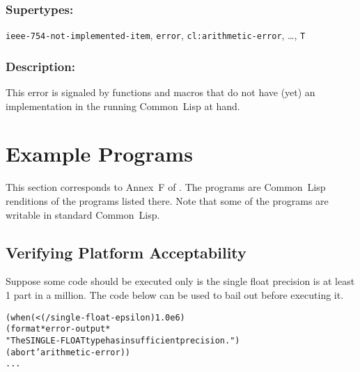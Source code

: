 \documentclass[10pt,fleqn]{article}
\newcommand{\CL}{\textsf{Common~Lisp}}
\newcommand{\code}[1]{\texttt{#1}}
\newcommand{\DSupertypes}{\subsubsection*{Supertypes:}}
\newcommand{\DDescription}{\subsubsection*{Description:}}
\begin{document}
\DSupertypes{}

\code{ieee-754-not-implemented-item}, \code{error},
\code{cl:arithmetic-error}, \ldots, \code{T}

\DDescription{}

This error is signaled by functions and macros that do not have (yet)
an implementation in the running \CL{} at hand.


\newpage

\nocite{2012:LIA1,2001:LIA2,2004:LIA3}
\nocite{1994:ANSICL}





  
  



\appendix

\section{Example Programs}

This section corresponds to Annex~F of \cite{2012:LIA1}.  The programs
are \CL{} renditions of the programs listed there.  Note that some of
the programs are writable in standard \CL{}.

\subsection{Verifying Platform Acceptability}

Suppose some code should be executed only is the single float
precision is at least 1 part in a million.  The code below can be used
to bail out before executing it.
\begin{alltt}
    (when (< (/ single-float-epsilon) 1.0e6)
        (format *error-output*
                "The SINGLE-FLOAT type has insufficient precision.")
        (abort 'arithmetic-error))
    ...
\end{alltt}
\end{document}
